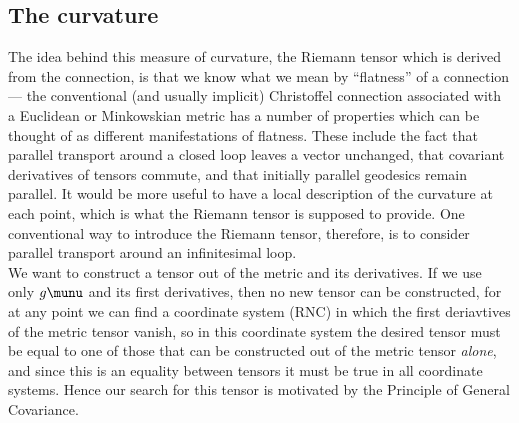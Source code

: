 \subsection{The curvature}
The idea behind this measure of curvature, the Riemann tensor which is derived from the connection, is that we
know what we mean by “flatness” of a connection — the conventional (and usually implicit)
Christoffel connection associated with a Euclidean or Minkowskian metric has a number of
properties which can be thought of as different manifestations of flatness. These include the
fact that parallel transport around a closed loop leaves a vector unchanged, that covariant
derivatives of tensors commute, and that initially parallel geodesics remain parallel. It would be more useful to have a local description of the curvature at each point, which is what the Riemann tensor is supposed to provide. One conventional way to introduce the
Riemann tensor, therefore, is to consider parallel transport around an infinitesimal loop.\\
We want to construct a tensor out of the metric and its derivatives. If we use only $g\munu$ and its first derivatives, then no new tensor can be constructed, for at any point we can find a coordinate system (RNC) in which the first deriavtives of the metric tensor vanish, so in this coordinate system the desired tensor must be equal to one of those that can be constructed out of the metric tensor \emph{alone}, and since this is an equality between tensors it must be true in all coordinate systems. Hence our search for this tensor is motivated by the Principle of General Covariance.

